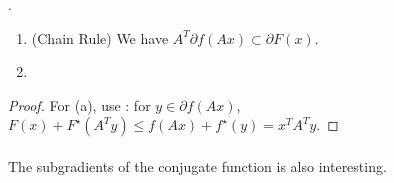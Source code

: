 \begin{prop}\label{prop:046-yoga-subgradients}.
	\begin{enumerate}[label=(\alph*)]
		\item (Chain Rule) We have $A^T\partial f(Ax)\subset \partial F(x)$.
		\item
	\end{enumerate}
\end{prop}

\begin{proof}
	For (a), use : for $y\in \partial f(Ax)$, $F(x)+F^\star(A^Ty)\leq f(Ax)+f^\star(y)=x^TA^Ty$.
\end{proof}

\paragraph{}The subgradients of the conjugate function is also interesting.

